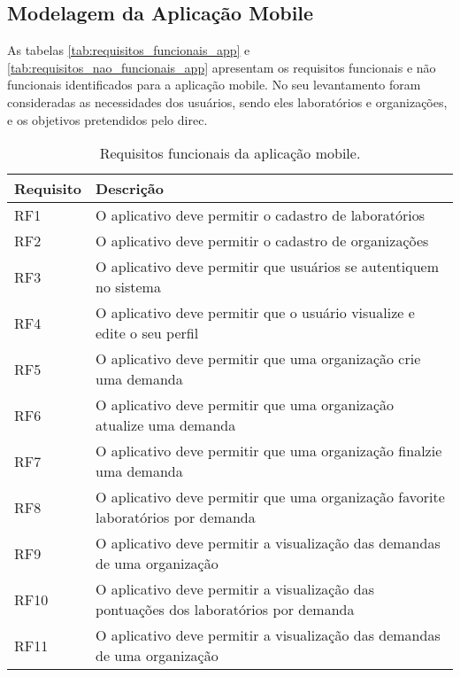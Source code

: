\subsection{Modelagem da Aplicação Mobile}\label{subsec:modelagem_app}

As tabelas \autoref{tab:requisitos_funcionais_app} e \autoref{tab:requisitos_nao_funcionais_app} apresentam os requisitos funcionais e não funcionais identificados para a aplicação mobile. No seu levantamento foram consideradas as necessidades dos usuários, sendo eles laboratórios e organizações, e os objetivos pretendidos pelo \gls{direc}.

\begin{table}[htb]
  \caption{Requisitos funcionais da aplicação mobile.}
  \label{tab:requisitos_funcionais_app}
  \begin{tabularx}{\textwidth}{l|l}
    \hline
    \textbf{Requisito} & \textbf{Descrição}                                                                    \\ \hline
    RF1                & O aplicativo deve permitir o cadastro de laboratórios                                 \\
    RF2                & O aplicativo deve permitir o cadastro de organizações                                 \\
    RF3                & O aplicativo deve permitir que usuários se autentiquem no sistema                     \\
    RF4                & O aplicativo deve permitir que o usuário visualize e edite o seu perfil               \\
    RF5                & O aplicativo deve permitir que uma organização crie uma demanda                       \\
    RF6                & O aplicativo deve permitir que uma organização atualize uma demanda                   \\
    RF7                & O aplicativo deve permitir que uma organização finalzie uma demanda                   \\
    RF8                & O aplicativo deve permitir que uma organização favorite laboratórios por demanda      \\
    RF9                & O aplicativo deve permitir a visualização das demandas de uma organização             \\
    RF10               & O aplicativo deve permitir a visualização das pontuações dos laboratórios por demanda \\
    RF11               & O aplicativo deve permitir a visualização das demandas de uma organização             \\ \hline
  \end{tabularx}
  \fonte{}
\end{table}

